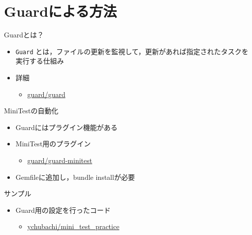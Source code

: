 \documentclass[t, aspectratio=169]{beamer}
\begin{document}
\section{Guardによる方法}
\label{sec-7-1}
\begin{frame}[fragile,label=sec-7-1-1]{Guardとは？}
 \begin{itemize}
\item \texttt{Guard} とは，ファイルの更新を監視して，更新があれば指定されたタスクを
実行する仕組み
\item 詳細
\begin{itemize}
\item \href{https://github.com/guard/guard}{guard/guard}
\end{itemize}
\end{itemize}
\end{frame}
\begin{frame}[label=sec-7-1-2]{MiniTestの自動化}
\begin{itemize}
\item Guardにはプラグイン機能がある
\item MiniTest用のプラグイン
\begin{itemize}
\item \href{https://github.com/guard/guard-minitest}{guard/guard-minitest}
\end{itemize}
\item Gemfileに追加し，bundle installが必要
\end{itemize}
\end{frame}
\begin{frame}[label=sec-7-1-3]{サンプル}
\begin{itemize}
\item Guard用の設定を行ったコード
\begin{itemize}
\item \href{https://github.com/ychubachi/mini_test_practice}{ychubachi/mini\_test\_practice}
\end{itemize}
\end{itemize}
\end{frame}
\end{document}

